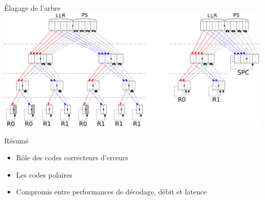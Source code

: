 \begin{frame}[c]{\'Elagage de l'arbre}
			\includegraphics[width=\textwidth]{./fig/pruning}
\end{frame}
	
	\begin{frame}[c]{Résumé}
	\vspace{-0.5cm}
	\begin{minipage}[t][2cm][t]{\textwidth}
		\begin{itemize}
			\item<+-> Rôle des codes correcteurs d'erreurs
			\item<+-> Les codes polaires
			\item<+-> Compromis entre performances de décodage, débit et latence
		\end{itemize}
	\end{minipage}
	\vspace{0.5cm}	
	\begin{minipage}[t][2cm][t]{\textwidth}
	\end{minipage}

\end{frame}
